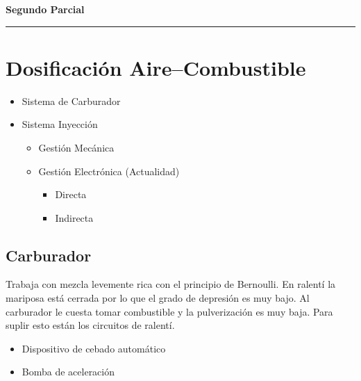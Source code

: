
\vspace{.9cm}
{\centering 
{\bf \LARGE Segundo Parcial \par}
}
\begin{center}
\vspace{-.2cm}\rule{3cm}{2pt}\par
\vspace{-.2cm}
\end{center}

\section{Dosificación Aire--Combustible}
\begin{itemize}
    \item Sistema de Carburador
    \item Sistema Inyección
    \begin{itemize}
        \item Gestión Mecánica
        \item Gestión Electrónica (Actualidad)
        \begin{itemize}
            \item Directa
            \item Indirecta
        \end{itemize}
    \end{itemize}
\end{itemize}
\subsection*{Carburador}
Trabaja con mezcla levemente rica con el principio de Bernoulli. En ralentí la mariposa está cerrada por lo que el grado de depresión es muy bajo. Al carburador le cuesta tomar combustible y la pulverización es muy baja. Para suplir esto están los circuitos de ralentí.
\begin{itemize}
    \item Dispositivo de cebado automático
    \item Bomba de aceleración
\end{itemize}


